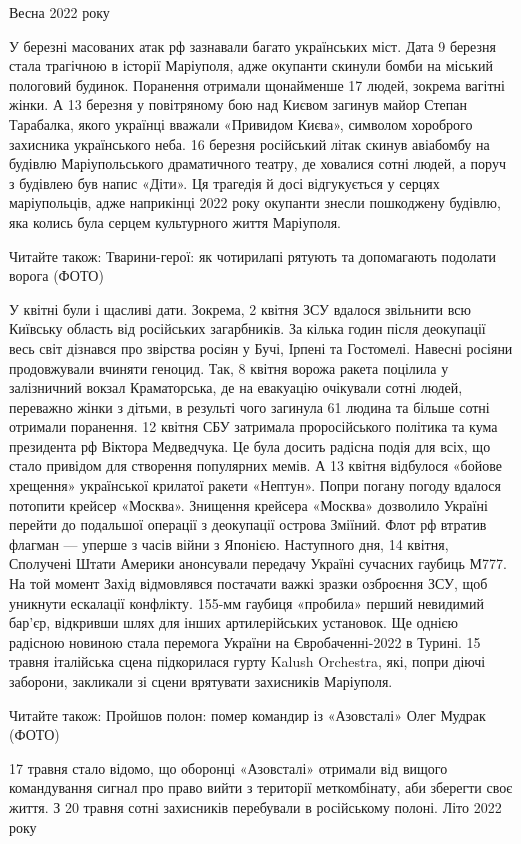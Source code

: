 Весна 2022 року

У березні масованих атак рф зазнавали багато українських міст. Дата 9 березня
стала трагічною в історії Маріуполя, адже окупанти скинули бомби на міський
пологовий будинок. Поранення отримали щонайменше 17 людей, зокрема вагітні
жінки. А 13 березня у повітряному бою над Києвом загинув майор Степан
Тарабалка, якого українці вважали «Привидом Києва», символом хороброго
захисника українського неба. 16 березня російський літак скинув авіабомбу на
будівлю Маріупольського драматичного театру, де ховалися сотні людей, а поруч з
будівлею був напис «Діти». Ця трагедія й досі відгукується у серцях
маріупольців, адже наприкінці 2022 року окупанти знесли пошкоджену будівлю, яка
колись була серцем культурного життя Маріуполя.

Читайте також: Тварини-герої: як чотирилапі рятують та допомагають подолати
ворога (ФОТО)

У квітні були і щасливі дати. Зокрема, 2 квітня ЗСУ вдалося звільнити всю
Київську область від російських загарбників. За кілька годин після деокупації
весь світ дізнався про звірства росіян у Бучі, Ірпені та Гостомелі. Навесні
росіяни продовжували вчиняти геноцид. Так, 8 квітня ворожа ракета поцілила у
залізничний вокзал Краматорська, де на евакуацію очікували сотні людей,
переважно жінки з дітьми, в результі чого загинула 61 людина та більше сотні
отримали поранення. 12 квітня СБУ затримала проросійського політика та кума
президента рф Віктора Медведчука. Це була досить радісна подія для всіх, що
стало привідом для створення популярних мемів. А 13 квітня відбулося «бойове
хрещення» української крилатої ракети «Нептун». Попри погану погоду вдалося
потопити крейсер «Москва». Знищення крейсера «Москва» дозволило Україні перейти
до подальшої операції з деокупації острова Зміїний. Флот рф втратив флагман —
уперше з часів війни з Японією. Наступного дня, 14 квітня, Сполучені Штати
Америки анонсували передачу Україні сучасних гаубиць М777. На той момент Захід
відмовлявся постачати важкі зразки озброєння ЗСУ, щоб уникнути ескалації
конфлікту. 155-мм гаубиця «пробила» перший невидимий бар'єр, відкривши шлях для
інших артилерійських установок. Ще однією радісною новиною стала перемога
України на Євробаченні-2022 в Турині. 15 травня італійська сцена підкорилася
гурту Kalush Orchestra, які, попри діючі заборони, закликали зі сцени врятувати
захисників Маріуполя.

Читайте також: Пройшов полон: помер командир із «Азовсталі» Олег Мудрак (ФОТО)

17 травня стало відомо, що оборонці «Азовсталі» отримали від вищого
командування сигнал про право вийти з території меткомбінату, аби зберегти
своє життя. З 20 травня сотні захисників перебували в російському полоні.
Літо 2022 року

